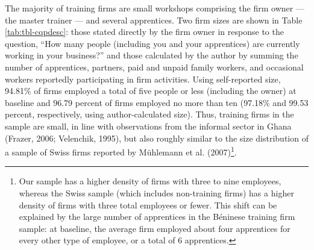 \documentclass[
  11pt,
a4paper
]{report}
\begin{document}
The majority of training firms are small workshops comprising the firm owner --- the master trainer --- and several apprentices. Two firm sizes are shown in Table \ref{tab:tbl-cqpdesc}: those stated directly by the firm owner in response to the question, ``How many people (including you and your apprentices) are currently working in your business?'' and those calculated by the author by summing the number of apprentices, partners, paid and unpaid family workers, and occasional workers reportedly participating in firm activities. Using self-reported size, 94.81\% of firms employed a total of five people or less (including the owner) at baseline and 96.79 percent of firms employed no more than ten (97.18\% and 99.53 percent, respectively, using author-calculated size). Thus, training firms in the sample are small, in line with observations from the informal sector in Ghana (Frazer, 2006; Velenchik, 1995), but also roughly similar to the size distribution of a sample of Swiss firms reported by Mühlemann et al. (2007)\footnote{Our sample has a higher density of firms with three to nine employees, whereas the Swiss sample (which includes non-training firms) has a higher density of firms with three total employees or fewer. This shift can be explained by the large number of apprentices in the Béninese training firm sample: at baseline, the average firm employed about four apprentices for every other type of employee, or a total of 6 apprentices.}.
\end{document}
